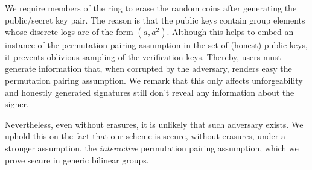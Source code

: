 

We require members of the ring to erase the random coins after generating the public/secret key pair. The reason is that the public keys contain group elements whose discrete logs are of the form $(a,a^2)$. Although this helps to embed an instance of the permutation pairing assumption in the set of (honest) public keys, it prevents oblivious sampling of the verification keys. Thereby, users must generate information that, when corrupted by the adversary, renders easy the permutation pairing assumption. We remark that this only affects unforgeability and honestly generated signatures still don't reveal any information about the signer.

Nevertheless, even without erasures, it is unlikely that such adversary exists. We uphold this on the fact that our scheme is secure, without erasures, under a stronger assumption, the \emph{interactive} permutation pairing assumption, which we prove secure in generic bilinear groups.
%
